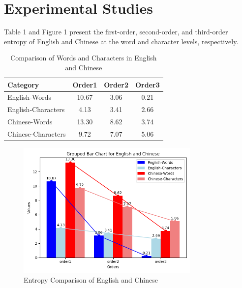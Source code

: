 \documentclass[12pt]{article}
\begin{document}
\section*{\centering Experimental Studies}
Table 1 and Figure 1 present the first-order, second-order, and third-order entropy of English and Chinese at the word and character levels, respectively.
\begin{table}[h!]
\centering
\begin{tabular}{lccc}
\hline
\textbf{Category} & \textbf{Order1} & \textbf{Order2} & \textbf{Order3} \\
\hline
English-Words & 10.67 & 3.06 & 0.21 \\
English-Characters & 4.13 & 3.41 & 2.66 \\
Chinese-Words & 13.30 & 8.62 & 3.74 \\
Chinese-Characters & 9.72 & 7.07 & 5.06 \\
\hline
\end{tabular}
\caption{Comparison of Words and Characters in English and Chinese}
\label{tab:language_comparison}
\end{table}

\begin{figure}[h!]
\centering
\includegraphics[width=0.8\textwidth]{entropy.png}
\caption{Entropy Comparison of English and Chinese}
\label{fig:entropy_comparison}
\end{figure}
\end{document}

